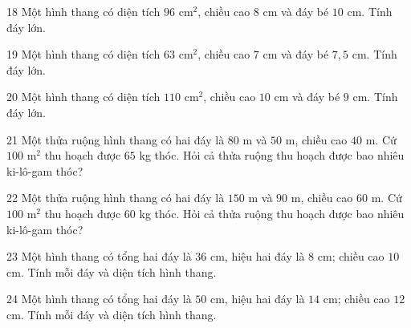 \gap
\begin{probbox}{18}{\relax}
Một hình thang có diện tích $96$ cm$^2$, chiều cao $8$ cm và đáy bé $10$ cm. Tính đáy lớn.
\end{probbox}
\gap
\begin{probbox}{19}{\relax}
Một hình thang có diện tích $63$ cm$^2$, chiều cao $7$ cm và đáy bé $7{,}5$ cm. Tính đáy lớn.
\end{probbox}
\gap
\begin{probbox}{20}{\relax}
Một hình thang có diện tích $110$ cm$^2$, chiều cao $10$ cm và đáy bé $9$ cm. Tính đáy lớn.
\end{probbox}
\gap
\begin{probbox}{21}{\relax}
Một thửa ruộng hình thang có hai đáy là $80$ m và $50$ m, chiều cao $40$ m. Cứ $100$ m$^2$ thu hoạch được $65$ kg thóc. Hỏi cả thửa ruộng thu hoạch được bao nhiêu ki-lô-gam thóc?
\end{probbox}
\gap
\begin{probbox}{22}{\relax}
Một thửa ruộng hình thang có hai đáy là $150$ m và $90$ m, chiều cao $60$ m. Cứ $100$ m$^2$ thu hoạch được $60$ kg thóc. Hỏi cả thửa ruộng thu hoạch được bao nhiêu ki-lô-gam thóc?
\end{probbox}
\gap
\begin{probbox}{23}{\relax}
Một hình thang có tổng hai đáy là $36$ cm, hiệu hai đáy là $8$ cm; chiều cao $10$ cm. Tính mỗi đáy và diện tích hình thang.
\end{probbox}
\gap
\begin{probbox}{24}{\relax}
Một hình thang có tổng hai đáy là $50$ cm, hiệu hai đáy là $14$ cm; chiều cao $12$ cm. Tính mỗi đáy và diện tích hình thang.
\end{probbox}

